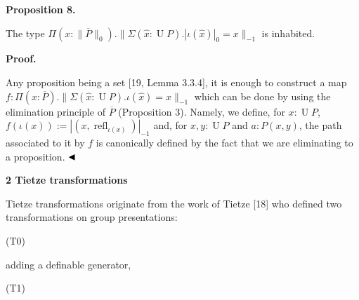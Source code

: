 \documentclass[10pt,a4paper]{amsart}
\begin{document}
 
 
\par\medskip\noindent\textbf{Proposition 8.}\par
 
 
The type $\Pi(x:\|\overline{P}\|_{0}).\|\Sigma(\hat{x}:\operatorname{U}P).|\iota(\hat{x})|_{0}=x\|_{-1}$ is inhabited.\par
 
 
 
 
 
\par\medskip\noindent\textbf{Proof.}\par
 
 
Any proposition being a set [19, Lemma 3.3.4], it is enough to construct a map $f:\Pi(x:\overline{P}).\|\Sigma(\hat{x}:\operatorname{U}P).\iota(\hat{x})=x\|_{-1}$ which can be done by using the elimination principle of $\overline{P}$ (Proposition 3). Namely, we define, for $x:\operatorname{U}P$, $f(\iota(x)):=|(x,\operatorname{refl}_{\iota(x)})|_{-1}$ and, for $x,y:\operatorname{U}P$ and $a:P(x,y)$, the path associated to it by $f$ is canonically defined by the fact that we are eliminating to a proposition. $\hfill\blacktriangleleft$\par
 
 
 
 


 
\par\medskip\noindent\textbf{2 Tietze transformations}\par
 
 
Tietze transformations originate from the work of Tietze [18] who defined two transformations on group presentations:\par
  (T0)  
 
adding a definable generator,\par
 
  (T1)  
 
\end{document}
